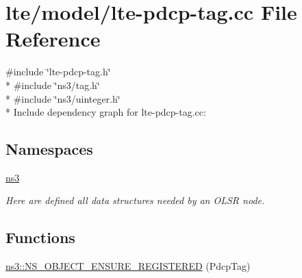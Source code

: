 \hypertarget{lte-pdcp-tag_8cc}{}\section{lte/model/lte-\/pdcp-\/tag.cc File Reference}
\label{lte-pdcp-tag_8cc}
{\ttfamily \#include \char`\"{}lte-\/pdcp-\/tag.\+h\char`\"{}}\\*
{\ttfamily \#include \char`\"{}ns3/tag.\+h\char`\"{}}\\*
{\ttfamily \#include \char`\"{}ns3/uinteger.\+h\char`\"{}}\\*
Include dependency graph for lte-\/pdcp-\/tag.cc\+:
\subsection*{Namespaces}
\begin{DoxyCompactItemize}
\item 
 \hyperlink{namespacens3}{ns3}
\begin{DoxyCompactList}\small\item\em Here are defined all data structures needed by an O\+L\+SR node. \end{DoxyCompactList}\end{DoxyCompactItemize}
\subsection*{Functions}
\begin{DoxyCompactItemize}
\item 
\hyperlink{namespacens3_a58fe4342b6b454490473e945ef5c386b}{ns3\+::\+N\+S\+\_\+\+O\+B\+J\+E\+C\+T\+\_\+\+E\+N\+S\+U\+R\+E\+\_\+\+R\+E\+G\+I\+S\+T\+E\+R\+ED} (Pdcp\+Tag)
\end{DoxyCompactItemize}
